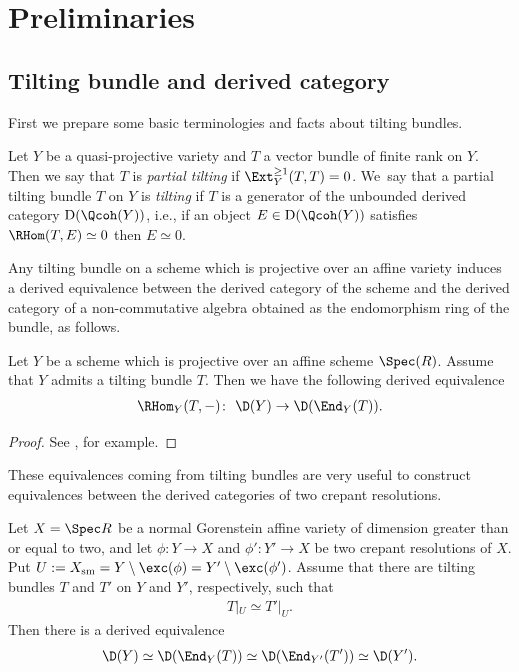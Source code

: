 \section{Preliminaries}

\subsection{Tilting bundle and derived category}

First we prepare some basic terminologies and facts about tilting bundles.

\begin{Definition}
Let $Y$ be a quasi-projective variety and $T$ a vector bundle of finite rank on $Y$.
Then we say that $T$ is \textit{partial tilting} if $\Ext_Y^{\geq 1}(T, T) = 0$.
We~say that a partial tilting bundle $T$ on $Y$ is \textit{tilting} if $T$ is a generator of the unbounded derived category $\mathrm{D}(\Qcoh(Y))$,
i.e., if an object $E \in \mathrm{D}(\Qcoh(Y))$ satisfies $\RHom(T,E) \simeq 0$ then $E \simeq 0$.
\end{Definition}

Any tilting bundle on a scheme which is projective over an affine variety
induces a derived equivalence between the derived category of the scheme and
the derived category of a non-commutative algebra obtained as the endomorphism ring of the bundle, as follows.

\begin{Proposition}
Let $Y$ be a scheme which is projective over an affine scheme $\Spec(R)$.
Assume that $Y$ admits a tilting bundle $T$.
Then we have the following derived equivalence
\begin{gather*}
\RHom_Y(T,-) \colon \ \D(Y) \to \D(\End_Y(T)).
\end{gather*}
\end{Proposition}

\begin{proof}
See \cite[Lemma 3.3]{TU10}, for example.
\end{proof}

These equivalences coming from tilting bundles are very useful to construct equivalences
between the derived categories of two crepant resolutions.

\begin{Lemma} \label{lem tilting equivalence flop}
Let $X = \Spec R$ be a normal Gorenstein affine variety of dimension greater than or equal to two,
and let $\phi\colon Y \to X$ and $\phi'\colon Y' \to X$ be two crepant resolutions of $X$.
Put $U := X_{\mathrm{sm}} = Y \setminus \exc(\phi) = Y' \setminus \exc(\phi')$.
Assume that there are tilting bundles $T$ and $T'$ on $Y$ and $Y'$, respectively, such that
\begin{gather*}
T|_U \simeq T'|_U.
\end{gather*}
Then there is a derived equivalence
\begin{gather*}
\D(Y) \simeq \D(\End_Y(T)) \simeq \D(\End_{Y'}(T')) \simeq \D(Y').
\end{gather*}
\end{Lemma}

